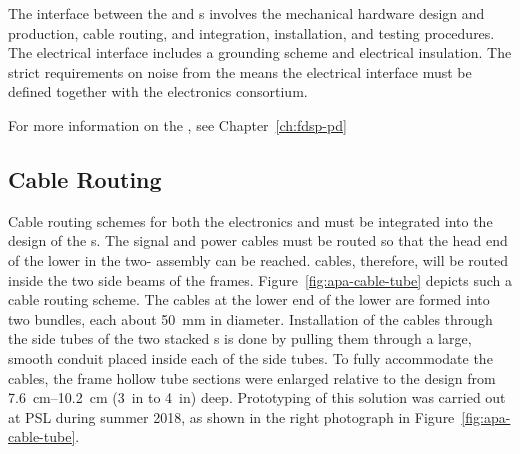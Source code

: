 The interface between the  and s involves the mechanical hardware design and production, cable routing, and integration, installation, and testing procedures. The electrical interface includes a grounding scheme and electrical insulation. The strict requirements on noise from the  means the electrical interface must be defined together with the   electronics consortium. 

For more information on the , see Chapter~\ref{ch:fdsp-pd} %



\subsection{Cable Routing}
\label{sec:fdsp-apa-intfc-cables}

Cable routing schemes for both the  electronics and  must be integrated into the design of the s.   The  signal and power cables must be routed so that the head end of the lower  in the two- assembly can be reached.  cables, therefore, will be routed inside the two side beams of the  frames. Figure~\ref{fig:apa-cable-tube} depicts such a cable routing scheme.  The  cables at the lower end of the lower  are formed into two bundles, each about \SI{50}{mm} in diameter. Installation of the cables through the side tubes of the two stacked s is done by pulling them through a large, smooth conduit placed inside each of the side tubes.  To fully accommodate the cables, the  frame hollow tube sections were enlarged relative to the  design from \SIrange{7.6}{10.2}{cm} (\SI{3}{in} to \SI{4}{in}) deep. Prototyping of this solution was carried out at PSL during summer 2018, as shown in the right photograph in Figure~\ref{fig:apa-cable-tube}.     



